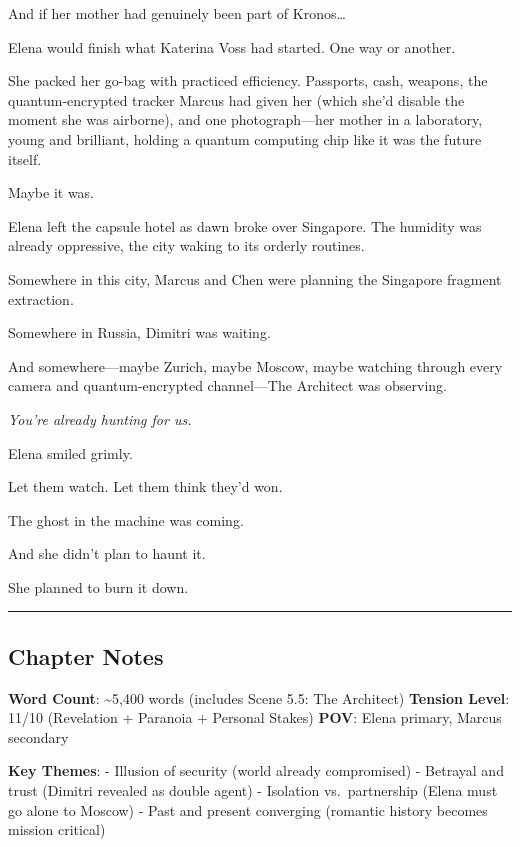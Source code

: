 And if her mother had genuinely been part of Kronos\ldots{}

Elena would finish what Katerina Voss had started. One way or another.

She packed her go-bag with practiced efficiency. Passports, cash,
weapons, the quantum-encrypted tracker Marcus had given her (which she'd
disable the moment she was airborne), and one photograph---her mother in
a laboratory, young and brilliant, holding a quantum computing chip like
it was the future itself.

Maybe it was.

Elena left the capsule hotel as dawn broke over Singapore. The humidity
was already oppressive, the city waking to its orderly routines.

Somewhere in this city, Marcus and Chen were planning the Singapore
fragment extraction.

Somewhere in Russia, Dimitri was waiting.

And somewhere---maybe Zurich, maybe Moscow, maybe watching through every
camera and quantum-encrypted channel---The Architect was observing.

\emph{You're already hunting for us.}

Elena smiled grimly.

Let them watch. Let them think they'd won.

The ghost in the machine was coming.

And she didn't plan to haunt it.

She planned to burn it down.

\begin{center}\rule{0.5\linewidth}{0.5pt}\end{center}

\hypertarget{chapter-notes}{%
\subsection{Chapter Notes}\label{chapter-notes}}

\textbf{Word Count}: \textasciitilde5,400 words (includes Scene 5.5: The
Architect) \textbf{Tension Level}: 11/10 (Revelation + Paranoia +
Personal Stakes) \textbf{POV}: Elena primary, Marcus secondary

\textbf{Key Themes}: - Illusion of security (world already compromised)
- Betrayal and trust (Dimitri revealed as double agent) - Isolation
vs.~partnership (Elena must go alone to Moscow) - Past and present
converging (romantic history becomes mission critical)


